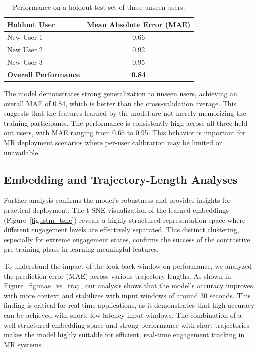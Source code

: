 \documentclass[review]{vgtc}                 %
\begin{document}
\begin{table}[h]
    \centering
    \caption{Performance on a holdout test set of three unseen users.}
    \label{tab:holdout_results}
    \setlength{\tabcolsep}{8pt}
    \begin{tabular}{lc}
        \hline
        \textbf{Holdout User} & \textbf{Mean Absolute Error (MAE)} \\
        \hline
        New User 1 & 0.66 \\
        New User 2 & 0.92 \\
        New User 3 & 0.95 \\
        \hline
        \textbf{Overall Performance} & \textbf{0.84} \\
        \hline
    \end{tabular}
\end{table}

The model demonstrates strong generalization to unseen users, achieving an overall MAE of 0.84, which is better than the cross-validation average. This suggests that the features learned by the model are not merely memorizing the training participants. The performance is consistently high across all three held-out users, with MAE ranging from 0.66 to 0.95. This behavior is important for MR deployment scenarios where per-user calibration may be limited or unavailable.

\subsection{Embedding and Trajectory-Length Analyses}
Further analysis confirms the model's robustness and provides insights for practical deployment. The t-SNE visualization of the learned embeddings (Figure~\ref{fig:lstm_tsne}) reveals a highly structured representation space where different engagement levels are effectively separated. This distinct clustering, especially for extreme engagement states, confirms the success of the contrastive pre-training phase in learning meaningful features.


To understand the impact of the look-back window on performance, we analyzed the prediction error (MAE) across various trajectory lengths. As shown in Figure~\ref{fig:mae_vs_traj}, our analysis shows that the model's accuracy improves with more context and stabilizes with input windows of around 30 seconds. This finding is critical for real-time applications, as it demonstrates that high accuracy can be achieved with short, low-latency input windows. The combination of a well-structured embedding space and strong performance with short trajectories makes the model highly suitable for efficient, real-time engagement tracking in MR systems.
\end{document}
